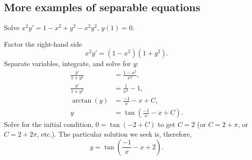 \subsection{More examples of separable equations}

\begin{example}
Solve $x^2y' = 1 - x^2+y^2 - x^2y^2$, $y(1) = 0$.

Factor the right-hand side
\begin{equation*}
x^2y' = (1 - x^2)(1+y^2) .
\end{equation*}
Separate variables, integrate, and solve for $y$:
\begin{align*}
\frac{y'}{1+y^2} & = \frac{1 - x^2}{x^2} , \\
\frac{y'}{1+y^2} & = \frac{1}{x^2} - 1 , \\
\arctan (y) & = \frac{-1}{x} - x + C , \\
y & = \tan \left(\frac{-1}{x} - x + C\right) .
\end{align*}
Solve for the initial condition, $0 = \tan(-2+C)$ to get $C=2$ (or $C = 2 +
\pi$, or $C = 2 + 2\pi$, etc.).  The particular solution we seek is, therefore,
\begin{equation*}
y = \tan \left(\frac{-1}{x} - x + 2 \right) .
\end{equation*}
\end{example}

